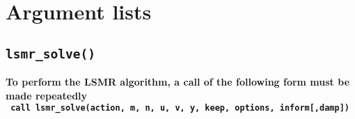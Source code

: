 \newpage
\section{Argument lists}

\subsection{\texttt{lsmr\_solve()}}
\textbf{%
   To perform the LSMR algorithm, a call of the following form must be made repeatedly\\
   \vspace{0.2cm}
   \texttt{ \hspace*{0.2cm}
      call lsmr\_solve(action, m, n, u, v, y, keep, options, inform[,damp])
   }
}

